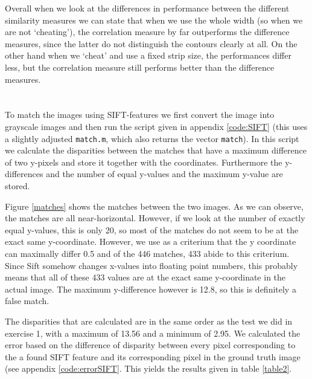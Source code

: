 \documentclass{article}
\begin{document}
Overall when we look at the differences in performance between the different similarity measures we can state that when we use the whole width (so when we are not `cheating'), the correlation measure by far outperforms the difference measures, since the latter do not distinguish the contours clearly at all. On the other hand when we `cheat' and use a fixed strip size, the performances differ less, but the correlation measure still performs better than the difference measures. 

\section{}


\section{}
To match the images using SIFT-features we first convert the image into grayscale images and then run the script given in appendix \ref{code:SIFT} (this uses a slightly adjusted \texttt{match.m}, which also returns the vector \texttt{match}). In this script we calculate the disparities between the matches that have a maximum difference of two y-pixels and store it together with the coordinates. Furthermore the y-differences and the number of equal y-values and the maximum y-value are stored.

Figure \ref{matches} shows the matches between the two images. As we can observe, the matches are all near-horizontal. However, if we look at the number of exactly equal y-values, this is only 20, so most of the matches do not seem to be at the exact same y-coordinate. However, we use as a criterium that the y coordinate can maximally differ 0.5 and of the 446 matches, 433 abide to this criterium. Since Sift somehow changes x-values into floating point numbers, this probably means that all of these 433 values are at the exact same y-coordinate in the actual image. The maximum y-difference however is 12.8, so this is definitely a false match.

The disparities that are calculated are in the same order as the test we did in exercise 1, with a maximum of 13.56 and a minimum of 2.95. We calculated the error based on the difference of disparity between every pixel corresponding to the a found SIFT feature and its corresponding pixel in the ground truth image (see appendix \ref{code:errorSIFT}. This yields the results given in table \ref{table2}. 
\end{document}
